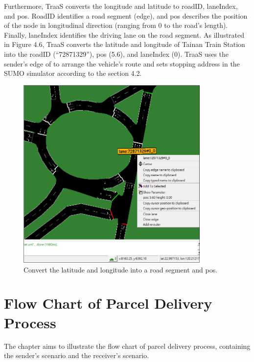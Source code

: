\documentclass[12pt]{ksthesis}
\begin{document}
\begin{thesis}
{Furthermore, TraaS converts the longitude and latitude to roadID, laneIndex, and pos. RoadID identifies a road segment (edge), and pos describes the position of the node in longitudinal direction (ranging from 0 to the road's length). Finally, laneIndex identifies the driving lane on the road segment.
As illustrated in Figure 4.6, TraaS converts the latitude and longitude of Tainan Train Station into the roadID (“72871329”), pos (5.6), and laneIndex (0).
TraaS uses the sender’s edge of to arrange the vehicle’s route and sets stopping address in the SUMO simulator according to the section 4.2.

\begin{figure}[H]
\centering
\includegraphics[width=0.85\textwidth]{./Thesis_figures/F4-6_GPS_SUMOMap.PNG}
\caption{\large Convert the latitude and longitude into a road segment and pos.}
\vspace{0.5cm}
\label{Fig:Convert_To_Road}
\end{figure}




\chapter{Flow Chart of Parcel Delivery Process}\label{Chap:Flow Chart of Parcel Delivery Process}

The chapter aims to illustrate the flow chart of parcel delivery process, containing the sender’s scenario and the receiver’s scenario.

}
\end{thesis}
\end{document}
